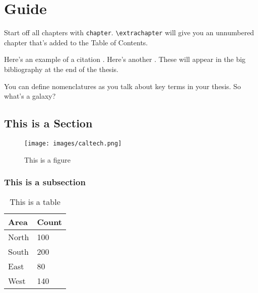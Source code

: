 \chapter{Guide}
Start off all chapters with \verb|chapter|.  \verb|\extrachapter| will give you an unnumbered chapter that's added to the Table of Contents. 

Here's an example of a citation \citep{GMP81}. Here's another \citep{PP98}. These will appear in the big bibliography at the end of the thesis.


You can define nomenclatures  as you talk about key terms in your thesis. So what's a galaxy? 


\section{This is a Section}
\lipsum[1-2]

\begin{figure}[hbt!]
    \centering
    \texttt{[image: images/caltech.png]}
    \caption{This is a figure}\label{fig:logo}
\end{figure}

\subsection{This is a subsection}

\begin{table}[hbt!]
    \centering
    \begin{tabular}{ll}
        \hline
        Area  & Count \\
        \hline
        North & 100   \\
        South & 200   \\
        East  & 80    \\
        West  & 140   \\
        \hline
    \end{tabular}
    \caption{This is a table}\label{tab:sample}
\end{table}

\lipsum[3] 

\lipsum[4-5]

